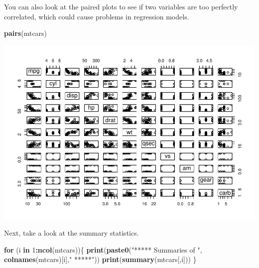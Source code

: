 \documentclass[
]{book}
\newenvironment{Shaded}{\begin{snugshade}}{\end{snugshade}}
\newcommand{\ControlFlowTok}[1]{\textcolor[rgb]{0.13,0.29,0.53}{\textbf{#1}}}
\newcommand{\DecValTok}[1]{\textcolor[rgb]{0.00,0.00,0.81}{#1}}
\newcommand{\FunctionTok}[1]{\textcolor[rgb]{0.13,0.29,0.53}{\textbf{#1}}}
\newcommand{\NormalTok}[1]{#1}
\newcommand{\SpecialCharTok}[1]{\textcolor[rgb]{0.81,0.36,0.00}{\textbf{#1}}}
\newcommand{\StringTok}[1]{\textcolor[rgb]{0.31,0.60,0.02}{#1}}
\begin{document}
You can also look at the paired plots to see if two variables are too perfectly correlated, which could cause problems in regression models.

\begin{Shaded}
\begin{Highlighting}[]
\FunctionTok{pairs}\NormalTok{(mtcars)}
\end{Highlighting}
\end{Shaded}

\includegraphics{bookdown-demo_files/figure-latex/unnamed-chunk-5-1.pdf}

Next, take a look at the summary statistics.

\begin{Shaded}
\begin{Highlighting}[]
\ControlFlowTok{for}\NormalTok{ (i }\ControlFlowTok{in} \DecValTok{1}\SpecialCharTok{:}\FunctionTok{ncol}\NormalTok{(mtcars))\{}
  \FunctionTok{print}\NormalTok{(}\FunctionTok{paste0}\NormalTok{(}\StringTok{"***** Summaries of "}\NormalTok{, }\FunctionTok{colnames}\NormalTok{(mtcars)[i],}\StringTok{" *****"}\NormalTok{))}
  \FunctionTok{print}\NormalTok{(}\FunctionTok{summary}\NormalTok{(mtcars[,i]))}
\NormalTok{\}}
\end{Highlighting}
\end{Shaded}
\end{document}
